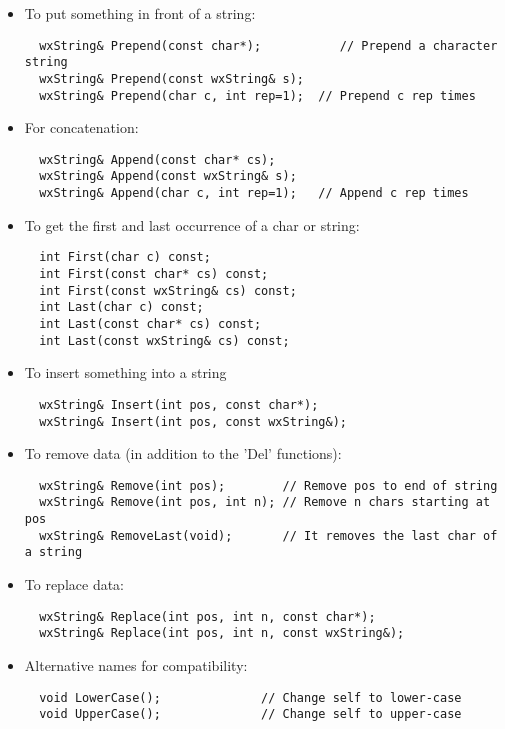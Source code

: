 \begin{itemize}
\item To put something in front of a string:
\begin{verbatim}
  wxString& Prepend(const char*);           // Prepend a character string
  wxString& Prepend(const wxString& s);
  wxString& Prepend(char c, int rep=1);  // Prepend c rep times
\end{verbatim}

\item For concatenation:
\begin{verbatim}
  wxString& Append(const char* cs);
  wxString& Append(const wxString& s);
  wxString& Append(char c, int rep=1);   // Append c rep times
\end{verbatim}

\item To get the first and last occurrence of a char or string:
\begin{verbatim}
  int First(char c) const;
  int First(const char* cs) const;
  int First(const wxString& cs) const;
  int Last(char c) const;
  int Last(const char* cs) const;
  int Last(const wxString& cs) const;
\end{verbatim}
  
\item To insert something into a string              
\begin{verbatim}
  wxString& Insert(int pos, const char*);
  wxString& Insert(int pos, const wxString&);
\end{verbatim}

\item To remove data (in addition to the 'Del' functions):
\begin{verbatim}
  wxString& Remove(int pos);        // Remove pos to end of string
  wxString& Remove(int pos, int n); // Remove n chars starting at pos
  wxString& RemoveLast(void);       // It removes the last char of a string
\end{verbatim}

\item To replace data:
\begin{verbatim}
  wxString& Replace(int pos, int n, const char*);
  wxString& Replace(int pos, int n, const wxString&);
\end{verbatim}

\item Alternative names for compatibility:
\begin{verbatim}
  void LowerCase();              // Change self to lower-case
  void UpperCase();              // Change self to upper-case
\end{verbatim}


\end{itemize}

